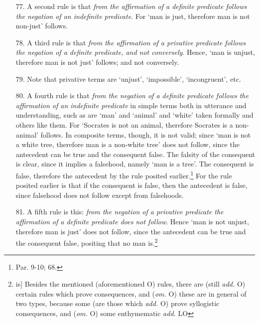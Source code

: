 \begin{itemize}
\item[77.] A second rule is that \textit{from the affirmation of a definite predicate follows the negation of an indefinite predicate}. For `man is just, therefore man is not non-just' follows.
\item[78.] A third rule is that \textit{from the affirmation of a privative predicate follows the negation of a definite predicate, and not conversely}. Hence, `man is unjust, therefore man is not just' follows; and not conversely.
\item[79.] Note that privative terms are `unjust', `impossible', `incongruent', etc.
\item[80.] A fourth rule is that \textit{from the negation of a definite predicate follows the affirmation of an indefinite predicate} in simple terms both in utterance and understanding, such as are `man' and `animal' and `white' taken formally and others like them. For `Socrates is not an animal, therefore Socrates is a non-animal' follows. In composite terms, though, it is not valid; since `man is not a white tree, therefore man is a non-white tree' does not follow, since the antecedent can be true and the consequent false. The falsity of the consequent is clear, since it implies a falsehood, namely `man is a tree'. The consequent is false, therefore the antecedent by the rule posited earlier.\footnote{Par. 9-10; 68.} For the rule posited earlier is that if the consequent is false, then the antecedent is false, since falsehood does not follow except from falsehoods.
\item[81.] A fifth rule is this: \textit{from the negation of a privative predicate the affirmation of a definite predicate does not follow}. Hence `man is not unjust, therefore man is just' does not follow, since the antecedent can be true and the consequent false, positing that no man is.\footnote{is] Besides the mentioned (aforementioned O) rules, there are (still \textit{add.} O) certain rules which prove consequences, and (\textit{om.} O) these are in general of two types, because some (are those which \textit{add.} O) prove syllogistic consequences, and (\textit{om.} O) some enthymematic \textit{add.} LO}
\end{itemize}
